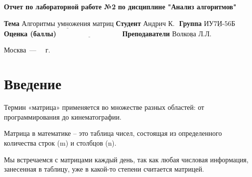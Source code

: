 \documentclass[12pt]{report}
\begin{document}
\begin{titlepage}
	
	\begin{center}
		\noindent\begin{minipage}{1.3\textwidth}\centering
			\Large\textbf{  Отчет по лабораторной работе №2}\newline
			\textbf{по дисциплине "Анализ алгоритмов"}\newline\newline
		\end{minipage}
	\end{center}
	
	\noindent\textbf{Тема} $\underline{\text{Алгоритмы умножения матриц}}$\newline\newline
	\noindent\textbf{Студент} $\underline{\text{Андрич К. }}$\newline\newline
	\noindent\textbf{Группа} $\underline{\text{ИУ7И-56Б}}$\newline\newline
	\noindent\textbf{Оценка (баллы)} $\underline{\text{~~~~~~~~~~~~~~~~~~~~~~~~~~~}}$\newline\newline
	\noindent\textbf{Преподаватели} $\underline{\text{Волкова Л.Л.}}$\newline\newline\newline
	
	\begin{center}
		\vfill
		Москва~---~\the\year
		~г.
	\end{center}
\end{titlepage}


\tableofcontents

\newpage
\chapter*{Введение}
Термин «матрица» применяется во множестве разных областей: от программирования до кинематографии.
\newline

Матрица в математике – это таблица чисел, состоящая из определенного количества строк (m) и столбцов (n).
\newline

Мы встречаемся с матрицами каждый день, так как любая числовая информация, занесенная в таблицу, уже в какой-то степени считается матрицей.
\newline
\end{document}
